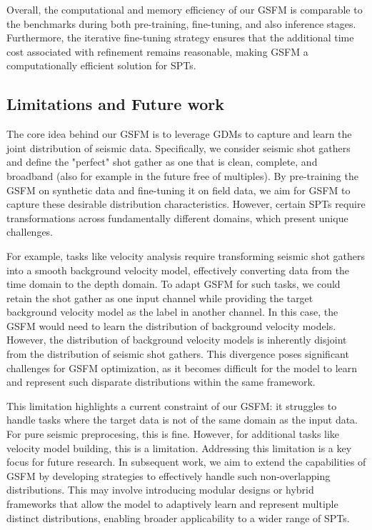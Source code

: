 Overall, the computational and memory efficiency of our GSFM is comparable to the benchmarks during both pre-training, fine-tuning, and also inference stages. Furthermore, the iterative fine-tuning strategy ensures that the additional time cost associated with refinement remains reasonable, making GSFM a computationally efficient solution for SPTs. 

\subsection{Limitations and Future work}
The core idea behind our GSFM is to leverage GDMs to capture and learn the joint distribution of seismic data. Specifically, we consider seismic shot gathers and define the "perfect" shot gather as one that is clean, complete, and broadband (also for example in the future free of multiples). By pre-training the GSFM on synthetic data and fine-tuning it on field data, we aim for GSFM to capture these desirable distribution characteristics. However, certain SPTs require transformations across fundamentally different domains, which present unique challenges. 

For example, tasks like velocity analysis require transforming seismic shot gathers into a smooth background velocity model, effectively converting data from the time domain to the depth domain. To adapt GSFM for such tasks, we could retain the shot gather as one input channel while providing the target background velocity model as the label in another channel. In this case, the GSFM would need to learn the distribution of background velocity models. However, the distribution of background velocity models is inherently disjoint from the distribution of seismic shot gathers. This divergence poses significant challenges for GSFM optimization, as it becomes difficult for the model to learn and represent such disparate distributions within the same framework. 

This limitation highlights a current constraint of our GSFM: it struggles to handle tasks where the target data is not of the same domain as the input data. For pure seismic preprocesing, this is fine. However, for additional tasks like velocity model building, this is a limitation. Addressing this limitation is a key focus for future research. In subsequent work, we aim to extend the capabilities of GSFM by developing strategies to effectively handle such non-overlapping distributions. This may involve introducing modular designs or hybrid frameworks that allow the model to adaptively learn and represent multiple distinct distributions, enabling broader applicability to a wider range of SPTs.

